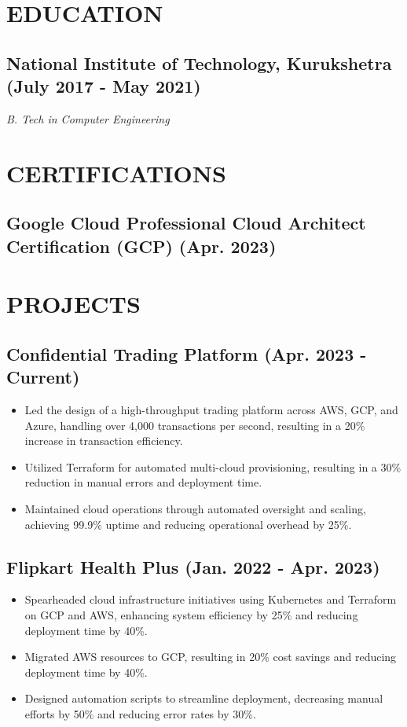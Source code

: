 \documentclass[a4paper,9pt]{article}
\begin{document}
\section*{EDUCATION}

\subsection*{National Institute of Technology, Kurukshetra (July 2017 - May 2021)}
\textit{B. Tech in Computer Engineering}

\section*{CERTIFICATIONS}
\subsection*{Google Cloud Professional Cloud Architect Certification (GCP) (Apr. 2023)}

\section*{PROJECTS}

\subsection*{Confidential Trading Platform (Apr. 2023 - Current)}
\begin{itemize}
    \item Led the design of a high-throughput trading platform across AWS, GCP, and Azure, handling over 4,000 transactions per second, resulting in a 20\% increase in transaction efficiency.
    \item Utilized Terraform for automated multi-cloud provisioning, resulting in a 30\% reduction in manual errors and deployment time.
    \item Maintained cloud operations through automated oversight and scaling, achieving 99.9\% uptime and reducing operational overhead by 25\%.
\end{itemize}

\subsection*{Flipkart Health Plus (Jan. 2022 - Apr. 2023)}
\begin{itemize}
    \item Spearheaded cloud infrastructure initiatives using Kubernetes and Terraform on GCP and AWS, enhancing system efficiency by 25\% and reducing deployment time by 40\%.
    \item Migrated AWS resources to GCP, resulting in 20\% cost savings and reducing deployment time by 40\%.
    \item Designed automation scripts to streamline deployment, decreasing manual efforts by 50\% and reducing error rates by 30\%.
\end{itemize}
\end{document}
